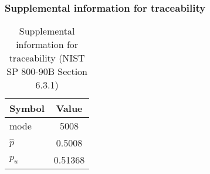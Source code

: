 \documentclass[a3paper,xelatex,english]{bxjsarticle}
\begin{document}
\subsubsection{Supplemental information for traceability}
\renewcommand{\arraystretch}{1.8}
\begin{table}[h]
\caption{Supplemental information for traceability (NIST SP 800-90B Section 6.3.1)}
\begin{center}
\begin{tabular}{|l|c|}
\hline 
\rowcolor{anotherlightblue} %
Symbol				& Value \\ \hline 
mode				&     5008\\ \hline 
$\hat{p}$ 			&   0.5008\\ \hline
$p_u$				&  0.51368\\ \hline
\end{tabular}
\end{center}
\end{table}
\renewcommand{\arraystretch}{1.4}
\clearpage
\end{document}
